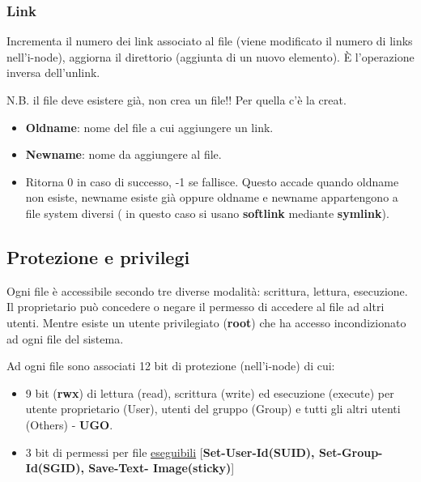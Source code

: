 \documentclass{article}
\begin{document}
\subsubsection{Link}
\noindent {} 
\medskip

\noindent Incrementa il numero dei link associato al file
 (viene modificato il numero di links nell'i-node), aggiorna il 
 direttorio (aggiunta di un nuovo elemento). È l'operazione 
 inversa dell'unlink.
 
 \noindent N.B. il file deve esistere già, non crea un file!! 
 Per quella c'è la creat.

\begin{itemize}
    \item \textbf{Oldname}: nome del file a cui aggiungere un link.
    \item \textbf{Newname}: nome da aggiungere al file.
    \item Ritorna 0 in caso di successo, -1 se fallisce. 
    Questo accade quando oldname non esiste,
     newname esiste già oppure oldname e newname 
     appartengono a file system diversi ( in questo caso 
     si usano \textbf{softlink} mediante \textbf{symlink}).
\end{itemize}

\subsection{Protezione e privilegi}
\noindent Ogni file è accessibile secondo tre diverse modalità: scrittura, lettura, esecuzione.
 Il proprietario può concedere o negare il permesso di accedere al file ad altri utenti. Mentre 
 esiste un utente privilegiato (\textbf{root}) che ha accesso incondizionato ad ogni file del 
 sistema.
 
 \noindent Ad ogni file sono associati 12 bit di protezione (nell'i-node) di cui:
\begin{itemize}
    \item 9 bit (\textbf{rwx}) di lettura (read), scrittura (write) ed esecuzione (execute) per utente
     proprietario (User), utenti del gruppo (Group) e tutti gli altri utenti (Others) - \textbf{UGO}.
    \item 3 bit di permessi per file \underline{eseguibili} [\textbf{Set-User-Id(SUID), Set-Group-Id(SGID), Save-Text- 
    Image(sticky)}]
\end{itemize}
\end{document}
